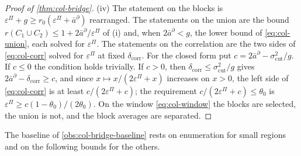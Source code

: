 \begin{proof}[Proof of \cref{thm:col-bridge}]
(iv) The statement on the blocks is $\varepsilon^\Pi+g\ge r_0(\varepsilon^\Pi+\bar a^\partial)$ rearranged. The statements on the union are the bound $r(C_1\cup C_2)\le1+2\bar a^\partial/\varepsilon^\Pi$ of (i) and, when $2\bar a^\partial<g$, the lower bound of \eqref{eq:col-union}, each solved for $\varepsilon^\Pi$. The statements on the correlation are the two sides of \eqref{eq:col-corr} solved for $\varepsilon^\Pi$ at fixed $\delta_{\mathrm{corr}}$. For the closed form put $c=2\bar a^\partial-\sigma^2_{\mathrm{cut}}/g$. If $c\le0$ the condition holds trivially. If $c>0$, then $\delta_{\mathrm{corr}}\le\sigma^2_{\mathrm{cut}}/g$ gives $2\bar a^\partial-\delta_{\mathrm{corr}}\ge c$, and since $x\mapsto x/(2\varepsilon^\Pi+x)$ increases on $x>0$, the left side of \eqref{eq:col-corr} is at least $c/(2\varepsilon^\Pi+c)$; the requirement $c/(2\varepsilon^\Pi+c)\le\theta_0$ is $\varepsilon^\Pi\ge c(1-\theta_0)/(2\theta_0)$. On the window \eqref{eq:col-window} the blocks are selected, the union is not, and the block averages are separated.
\end{proof}

The baseline of \cref{obs:col-bridge-baseline} rests on enumeration for small regions and on the following bounds for the others.

